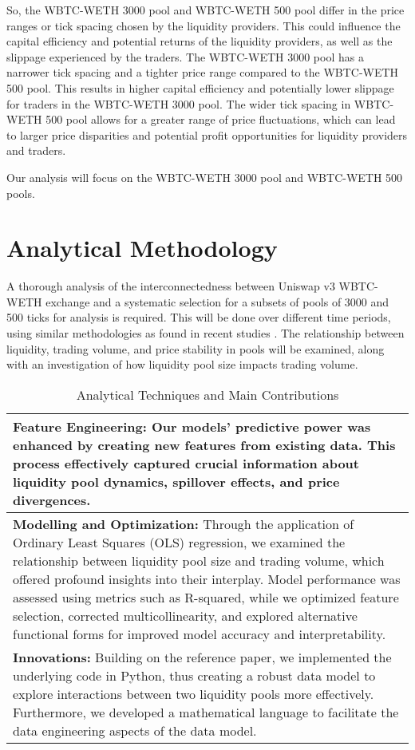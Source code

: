 \documentclass{article}
\begin{document}
So, the WBTC-WETH 3000 pool and WBTC-WETH 500 pool differ in the price ranges or tick spacing chosen by the liquidity providers. This could influence the capital efficiency and potential returns of the liquidity providers, as well as the slippage experienced by the traders. The WBTC-WETH 3000 pool has a narrower tick spacing and a tighter price range compared to the WBTC-WETH 500 pool. This results in higher capital efficiency and potentially lower slippage for traders in the WBTC-WETH 3000 pool. The wider tick spacing in WBTC-WETH 500 pool allows for a greater range of price fluctuations, which can lead to larger price disparities and potential profit opportunities for liquidity providers and traders.

Our analysis will focus on the WBTC-WETH 3000 pool and WBTC-WETH 500 pools.

\section{\textbf{Analytical Methodology}}

A thorough analysis of the interconnectedness between Uniswap v3 WBTC-WETH exchange and a systematic selection for a subsets of pools of 3000 and 500 ticks for analysis is required. This will be done over different time periods, using similar methodologies as found in recent studies \cite{Miori2022}. The relationship between liquidity, trading volume, and price stability in pools will be examined, along with an investigation of how liquidity pool size impacts trading volume.

\begin{table}[htbp]
  \centering
  \small
  \begin{tabularx}{\linewidth}{|>{\raggedright\arraybackslash}X|}
  \hline
  \textbf{Feature Engineering:} Our models' predictive power was enhanced by creating new features from existing data\cite{Miori2023}. This process effectively captured crucial information about liquidity pool dynamics, spillover effects, and price divergences. \\
  \hline
  \textbf{Modelling and Optimization:} Through the application of Ordinary Least Squares (OLS) regression, we examined the relationship between liquidity pool size and trading volume, which offered profound insights into their interplay\cite{Miori2023}. Model performance was assessed using metrics such as R-squared, while we optimized feature selection, corrected multicollinearity, and explored alternative functional forms for improved model accuracy and interpretability\cite{Miori2023}. \\
  \hline
  \textbf{Innovations:} Building on the reference paper, we implemented the underlying code in Python, thus creating a robust data model to explore interactions between two liquidity pools more effectively\cite{Miori2023}. Furthermore, we developed a mathematical language to facilitate the data engineering aspects of the data model\cite{Miori2023}. \\
  \hline
  \end{tabularx}
  \caption{Analytical Techniques and Main Contributions}
  \label{fig:analytical-techniques}
  \end{table}
  
\end{document}
